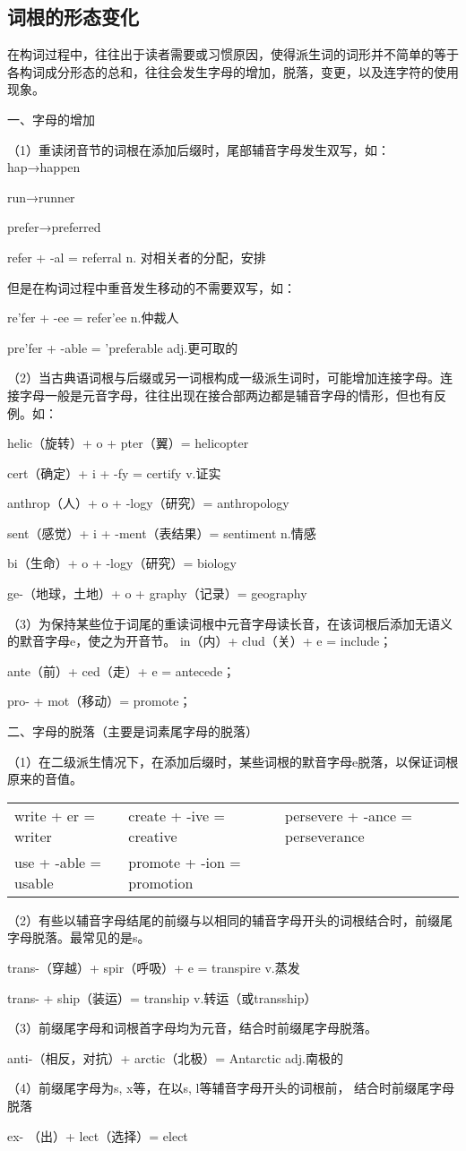 \subsection{词根的形态变化}
在构词过程中，往往出于读者需要或习惯原因，使得派生词的词形并不简单的等于各构词成分形态的总和，往往会发生字母的增加，脱落，变更，以及连字符的使用现象。

一、字母的增加

（1）重读闭音节的词根在添加后缀时，尾部辅音字母发生双写，如：
hap→happen

run→runner

prefer→preferred

refer + -al = referral n. 对相关者的分配，安排

但是在构词过程中重音发生移动的不需要双写，如：

re’fer + -ee = refer’ee n.仲裁人

pre’fer + -able = ’preferable adj.更可取的

（2）当古典语词根与后缀或另一词根构成一级派生词时，可能增加连接字母。连接字母一般是元音字母，往往出现在接合部两边都是辅音字母的情形，但也有反例。如：

helic（旋转）+ o + pter（翼）= helicopter

cert（确定）+ i + -fy = certify v.证实

anthrop（人）+ o + -logy（研究）= anthropology

sent（感觉）+ i + -ment（表结果）= sentiment n.情感

bi（生命）+ o + -logy（研究）= biology

ge-（地球，土地）+ o + graphy（记录）= geography

（3）为保持某些位于词尾的重读词根中元音字母读长音，在该词根后添加无语义的默音字母e，使之为开音节。
 in（内）+ clud（关）+ e = include；
 
 ante（前）+ ced（走）+ e = antecede；
 
 pro- + mot（移动）= promote；

二、字母的脱落（主要是词素尾字母的脱落）

（1）在二级派生情况下，在添加后缀时，某些词根的默音字母e脱落，以保证词根原来的音值。

\begin{tabular}{@{}lll@{}}
write + er = writer&create + -ive = creative&persevere + -ance = perseverance\\
use + -able = usable&promote + -ion = promotion
\end{tabular}

（2）有些以辅音字母结尾的前缀与以相同的辅音字母开头的词根结合时，前缀尾字母脱落。最常见的是s。

trans-（穿越）+ spir（呼吸）+ e = transpire v.蒸发

trans- + ship（装运）= tranship v.转运（或transship）

（3）前缀尾字母和词根首字母均为元音，结合时前缀尾字母脱落。

    anti-（相反，对抗）+ arctic（北极）= Antarctic adj.南极的

（4）前缀尾字母为s, x等，在以s, l等辅音字母开头的词根前， 结合时前缀尾字母脱落

ex- （出）+ lect（选择）= elect 

